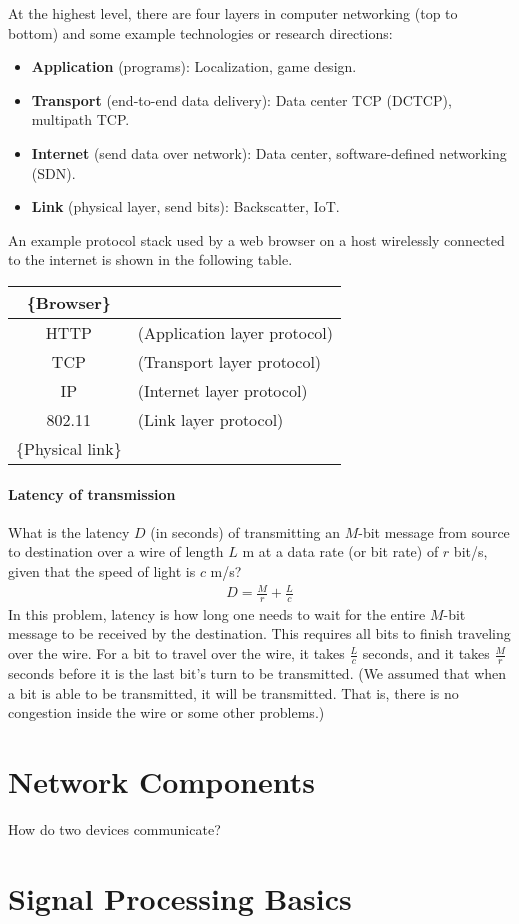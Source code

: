 \documentclass[12pt]{article}
\begin{document}
At the highest level, there are four layers in computer networking (top to bottom) and some example technologies or research directions:
\begin{itemize}
\item \textbf{Application} (programs): Localization, game design.
\item \textbf{Transport} (end-to-end data delivery): Data center TCP (DCTCP), multipath TCP.
\item \textbf{Internet} (send data over network): Data center, software-defined networking (SDN).
\item \textbf{Link} (physical layer, send bits): Backscatter, IoT.
\end{itemize}

An example protocol stack used by a web browser on a host wirelessly connected to the internet is shown in the following table.
\begin{center}
  \begin{tabular}{|c|l|}
    \hline
    \{Browser\} & \\
    \hline
    HTTP & (Application layer protocol)\\
    \hline
    TCP  & (Transport layer protocol)\\
    \hline
    IP   & (Internet layer protocol)\\
    \hline
    802.11 & (Link layer protocol)\\
    \hline
    \{Physical link\} &\\
    \hline
  \end{tabular}
\end{center}

\paragraph{Latency of transmission} What is the latency $D$ (in seconds) of transmitting an $M$-bit message from source to destination over a wire of length $L$ m at a data rate (or bit rate) of $r$ bit/s, given that the speed of light is $c$ m/s?
\begin{align}
  D = \frac{M}{r} + \frac{L}{c}
\end{align}
In this problem, latency is how long one needs to wait for the entire $M$-bit message to be received by the destination. This requires all bits to finish traveling over the wire. For a bit to travel over the wire, it takes $\frac{L}{c}$ seconds, and it takes $\frac{M}{r}$ seconds before it is the last bit's turn to be transmitted. (We assumed that when a bit is able to be transmitted, it will be transmitted. That is, there is no congestion inside the wire or some other problems.)


\section{Network Components}

How do two devices communicate?

\section{Signal Processing Basics}





\end{document}
